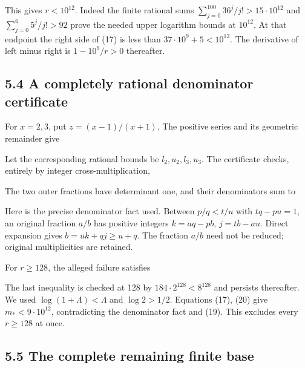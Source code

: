 This gives \(r<10^{12}\). Indeed the finite rational sums
\(\sum_{j=0}^{100}36^j/j!>15\cdot10^{12}\) and
\(\sum_{j=0}^{6}5^j/j!>92\) prove the needed upper logarithm bounds at
\(10^{12}\). At that endpoint the right side of (17) is less than
\(37\cdot10^9+5<10^{12}\). The derivative of left minus right is
\(1-10^9/r>0\) thereafter.

\subsection{5.4 A completely rational denominator certificate}

For \(x=2,3\), put \(z=(x-1)/(x+1)\). The positive series and its
geometric remainder give


Let the corresponding rational bounds be \(l_2,u_2,l_3,u_3\). The
certificate checks, entirely by integer cross-multiplication,

 

The two outer fractions have determinant one, and their denominators sum
to


Here is the precise denominator fact used. Between \(p/q<t/u\) with
\(tq-pu=1\), an original fraction \(a/b\) has positive integers
\(k=aq-pb\), \(j=tb-au\). Direct expansion gives \(b=uk+qj\ge u+q\). The
fraction \(a/b\) need not be reduced; original multiplicities are
retained.

For \(r\ge128\), the alleged failure satisfies


The last inequality is checked at 128 by \(184\cdot2^{128}<8^{128}\) and
persists thereafter. We used \(\log(1+\Lambda)<\Lambda\) and
\(\log2>1/2\). Equations (17), (20) give \(m_*<9\cdot10^{12}\),
contradicting the denominator fact and (19). This excludes every
\(r\ge128\) at once.

\subsection{5.5 The complete remaining finite base}

